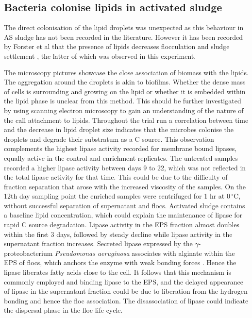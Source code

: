 \documentclass[11pt]{article}
\begin{document}
\subsection{Bacteria colonise lipids in activated sludge}
The direct colonisation of the lipid droplets was unexpected as this behaviour in AS sludge has not been recorded in the literature. However it has been recorded by Forster et al that the presence of lipids decreases flocculation and sludge settlement \cite{Forster_92}, the latter of which was observed in this experiment.

The microscopy pictures showcase the close association of biomass with the lipids. The aggregation around the droplets is akin to biofilms. Whether the dense mass of cells is surrounding and growing on the lipid or whether it is embedded within the lipid phase is unclear from this method. This should be further investigated by using scanning electron microscopy to gain an understanding of the nature of the call attachment to lipids.
Throughout the trial run a correlation between time and the decrease in lipid droplet size indicates that the microbes colonise the droplets and degrade their substratum as a C source. This observation complements the highest lipase activity recorded for membrane bound lipases, equally active in the control and enrichment replicates. The untreated samples recorded a higher lipase activity between days 9 to 22, which was not reflected in the total lipase activity for that time. This could be due to the difficulty of fraction separation that arose with the increased viscosity of the samples. On the 12th day sampling point the enriched samples were centrifuged for 1 hr at $0\,^{\circ}\mathrm{C}$, without successful separation of supernatant and flocs. 
Activated sludge contains a baseline lipid concentration, which could explain the maintenance of lipase for rapid C source degradation. Lipase activity in the EPS fraction almost doubles within the first 3 days, followed by steady decline while lipase activity in the supernatant fraction increases. Secreted lipase expressed by the \emph{$\gamma$}-proteobacterium \textit{Pseudomonas aeruginosa} associates with alginate within the EPS of flocs, which anchors the enzyme with weak bonding forces \cite{mayer1999role,wicker1987}. Hence the lipase  liberates fatty acids close to the cell. It follows that this mechanism is commonly employed and binding lipase to the EPS, and the delayed appearance of lipase in the supernatant fraction could be due to liberation from the hydrogen bonding and hence the floc association. The disassociation of lipase could indicate the dispersal phase in the floc life cycle.
\end{document}
